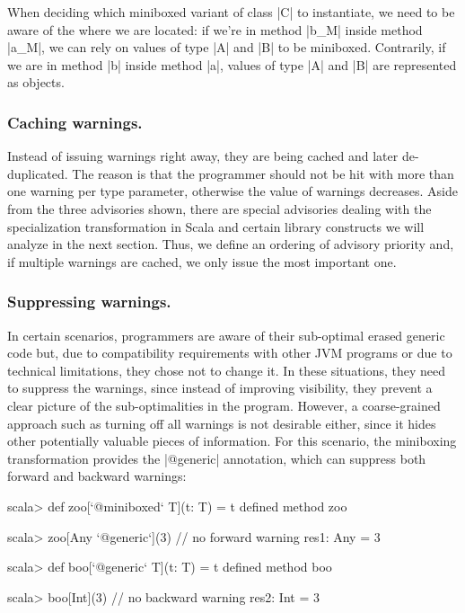 When deciding which miniboxed variant of class |C| to instantiate, we need to be aware of the where we are located: if we're in method |b_M| inside method |a_M|, we can rely on values of type |A| and |B| to be miniboxed. Contrarily, if we are in method |b| inside method |a|, values of type |A| and |B| are represented as objects.

\subsubsection{Caching warnings.} Instead of issuing warnings right away, they are being cached and later de-duplicated. The reason is that the programmer should not be hit with more than one warning per type parameter, otherwise the value of warnings decreases. Aside from the three advisories shown, there are special advisories dealing with the specialization transformation in Scala and certain library constructs we will analyze in the next section. Thus, we define an ordering of advisory priority and, if multiple warnings are cached, we only issue the most important one.

\subsubsection{Suppressing warnings.} In certain scenarios, programmers are aware of their sub-optimal erased generic code but, due to compatibility requirements with other JVM programs or due to technical limitations, they chose not to change it. In these situations, they need to suppress the warnings, since instead of improving visibility, they prevent a clear picture of the sub-optimalities in the program. However, a coarse-grained approach such as turning off all warnings is not desirable either, since it hides other potentially valuable pieces of information. For this scenario, the miniboxing transformation provides the |@generic| annotation, which can suppress both forward and backward warnings:

\begin{lstlisting-nobreak}
 scala> def zoo[`@miniboxed` T](t: T) = t
 defined method zoo

 scala> zoo[Any `@generic`](3) // no forward warning
 res1: Any = 3

 scala> def boo[`@generic` T](t: T) = t
 defined method boo

 scala> boo[Int](3)                   // no backward warning
 res2: Int = 3
\end{lstlisting-nobreak}


